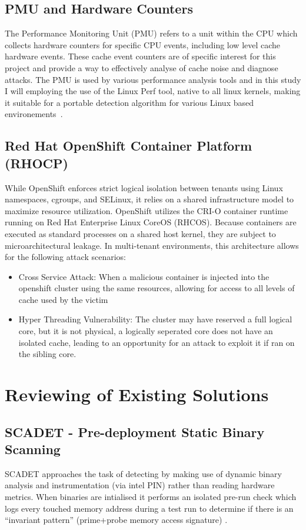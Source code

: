 \documentclass[11pt,a4paper, notitlepage]{article}
\begin{document}
\subsection{PMU and Hardware Counters}
The Performance Monitoring Unit (PMU) refers to a unit within the CPU which collects hardware counters for specific CPU events, including low level 
cache hardware events.
These cache event counters are of specific interest for this project and provide a way to effectively analyse of cache noise and diagnose attacks. 
The PMU is used by various performance analysis tools and in this study I will employing the use of the 
Linux Perf tool, native to all linux kernels, making it suitable for a portable detection algorithm for various Linux based environements~\cite{arm_pmu}. 
\subsection{Red Hat OpenShift Container Platform (RHOCP)}
While OpenShift enforces strict logical isolation between tenants using Linux namespaces, cgroups, and SELinux, it relies on a shared infrastructure model to maximize resource utilization. 
OpenShift utilizes the CRI-O container runtime running on Red Hat Enterprise Linux CoreOS (RHCOS). 
Because containers are executed as standard processes on a shared host kernel, they are subject to microarchitectural leakage. 
In multi-tenant environments, this architecture allows for the following attack scenarios:
\smallskip
\begin{itemize}[nosep]
    \item Cross Service Attack: {When a malicious container is injected into the openshift cluster using the same resources, allowing for access to all levels of cache used by the victim}
    \smallskip
    \item Hyper Threading Vulnerability: {The cluster may have reserved a full logical core, but it is not physical, a logically seperated core does not have an isolated cache, leading to an opportunity for an attack to exploit it if ran on the sibling core.}
\end{itemize}


\section{Reviewing of Existing Solutions}
\subsection{SCADET - Pre-deployment Static Binary Scanning}
SCADET approaches the task of detecting by making use of dynamic binary analysis and instrumentation (via intel PIN) rather than reading hardware metrics. When binaries 
are intialised it performs an isolated pre-run check which logs every touched memory address during a test run to determine if there is an ``invariant pattern'' 
(prime+probe memory access signature) \cite{scadet}.
\end{document}
